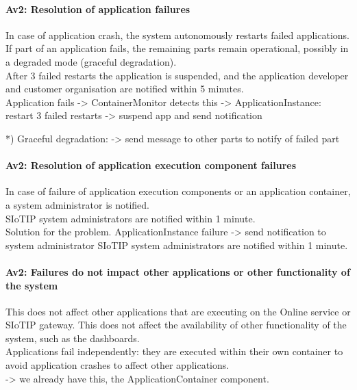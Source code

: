     \paragraph{Av2: Resolution of application failures}
        In case of application crash, the system autonomously restarts failed applications.
        If part of an application fails, the remaining parts remain operational,
        possibly in a degraded mode (graceful degradation). \\
        After 3 failed restarts the application is suspended, and the
        application developer and customer organisation are notified within 5 minutes.\\
        Application fails -> ContainerMonitor detects this -> ApplicationInstance: restart
        3 failed restarts -> suspend app and send notification

        *) Graceful degradation:
        -> send message to other parts to notify of failed part

    \paragraph{Av2: Resolution of application execution component failures}
        In case of failure of application execution components or an application
        container, a system administrator is notified. \\
        SIoTIP system administrators are notified within 1 minute.\\
        Solution for the problem.
        ApplicationInstance failure -> send notification to system administrator
        SIoTIP system administrators are notified within 1 minute.

    \paragraph{Av2: Failures do not impact other applications or other functionality of the system}
        This does not affect other applications that are executing on the Online
        service or SIoTIP gateway. This does not affect the availability of
        other functionality of the system, such as the dashboards. \\
        Applications fail independently: they are executed within their own
        container to avoid application crashes to affect other applications.\\
       -> we already have this, the ApplicationContainer component.

